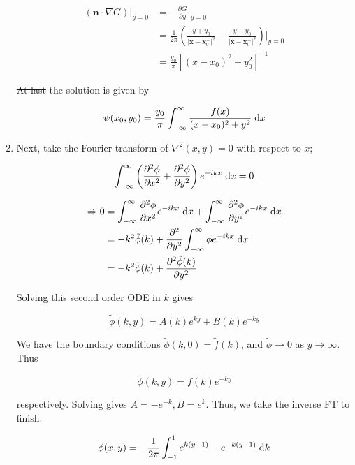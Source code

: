 \documentclass[a4paper]{article}
\begin{document}
\begin{enumerate}
	\begin{align*}
	(\mathbf{n} \cdot \nabla G )|_{y = 0} & = - \frac{\partial G }{\partial y} \Big|_{y = 0} \\
	& = \frac{1}{2\pi} \left(  \frac{y + y_{0}}{| \mathbf{x} - \mathbf{x}_{0}^{-} |^{2}} - \frac{y - y_{0}}{| \mathbf{x} - \mathbf{x}_{0}^{-} |^{2}} \right) \Big|_{y = 0} \\
	& = \frac{y_{0}}{\pi} [  (x - x_{0})^{2} + y_{0}^{2}   ]^{-1}
	\end{align*}
	
	\st{At last} the solution is given by
	
	\[ \psi(x_{0},y_{0}) = \frac{y_{0}}{\pi} \int_{-\infty}^{\infty} \frac{f(x)}{(x - x_{0})^{2} + y^{2} } \; \mathrm{d} x \]
	
	\item Next, take the Fourier transform of $ \nabla^{2}(x,y) = 0 $ with respect to $ x $;
	
	\[ \int_{-\infty}^{\infty} \left(  \frac{\partial^{2} \phi }{\partial x^{2}} + \frac{\partial^{2} \phi }{\partial y^{2}} \right) e^{-ikx} \; \mathrm{d} x = 0  \]
	
	\begin{align*}
	\Rightarrow 0 & = \int_{-\infty}^{\infty}  \frac{\partial^{2} \phi }{\partial x^{2}}  e^{-ikx} \; \mathrm{d} x  + \int_{-\infty}^{\infty} \frac{\partial^{2} \phi }{\partial y^{2}} e^{-ikx} \; \mathrm{d} x\\
	& = - k^{2} \tilde{\phi}(k) + \frac{\partial^{2} }{\partial y^{2}} \int_{-\infty}^{\infty}  \phi e^{- i k x} \; \mathrm{d} x\\
	& = - k^{2} \tilde{\phi}(k) +  \frac{\partial^{2} \tilde{\phi}(k) }{\partial y^{2}}
	\end{align*}
	
	Solving this second order ODE in $ k $ gives
	
	\[ \tilde{\phi}(k,y) = A(k) e^{ky} + B(k) e^{-ky}  \]
	
	We have the boundary conditions $ \tilde{\phi}(k,0) = \tilde{f}(k) $, and $ \tilde{\phi} \to 0 $ as $ y \to \infty $. Thus

	\[ \tilde{\phi}(k,y) = \tilde{f}(k) e^{-ky}  \]
	
	respectively. Solving gives $  A = - e^{-k}, B = e^{k} $. Thus, we take the inverse FT to finish.
	
	\begin{align*}
	\phi(x,y) &  = - \frac{1}{2\pi}  \int_{-1}^{1} e^{k(y-1)} - e^{-k(y-1)} \; \mathrm{d} k \\
	\end{align*}
	

	
\end{enumerate}
\end{document}
